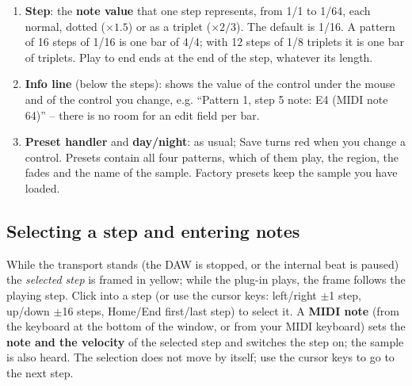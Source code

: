 \documentclass[12pt]{article}
\begin{document}
\begin{enumerate}
    \item \textbf{Step}: the \textbf{note value} that one step represents, from 1/1 to 1/64, each normal, dotted ($\times 1.5$) or as a triplet ($\times 2/3$). The default is 1/16.
    A pattern of 16 steps of 1/16 is one bar of 4/4; with 12 steps of 1/8 triplets it is one bar of triplets. Play to end ends at the end of the step, whatever its length.
    \item \textbf{Info line} (below the steps): shows the value of the control under the mouse and of the control you change,
    e.g. ``Pattern 1, step 5 note: E4 (MIDI note 64)'' -- there is no room for an edit field per bar.
    \item \textbf{Preset handler} and \textbf{day/night}: as usual; Save turns red when you change a control.
    Presets contain all four patterns, which of them play, the region, the fades and the name of the sample. Factory presets keep the sample you have loaded.
\end{enumerate}

\subsection{Selecting a step and entering notes}
While the transport stands (the DAW is stopped, or the internal beat is paused) the \emph{selected step} is framed in yellow; while
the plug-in plays, the frame follows the playing step. Click into a step (or use the cursor keys: left/right $\pm$1 step,
up/down $\pm$16 steps, Home/End first/last step) to select it. A \textbf{MIDI note} (from the keyboard at the bottom of the window,
or from your MIDI keyboard) sets the \textbf{note and the velocity} of the selected step and switches the step on; the sample
is also heard. The selection does not move by itself; use the cursor keys to go to the next step.
\end{document}
